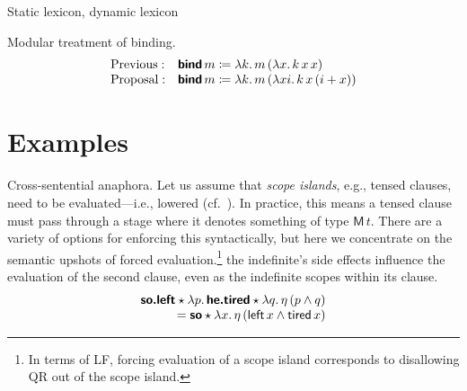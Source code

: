 	Static lexicon, dynamic lexicon
	
	Modular treatment of binding.%
	\[\begin{array}{ll}
		\text{Previous}:& \bsf{bind}\,m \ceq \lambda k.\,m\,(\lambda x.\,k\,x\,x)%
		\\
		\text{Proposal}:& \bsf{bind}\,m \ceq \lambda k.\,m\,(\lambda xi.\,k\,x\,(i + x))%
	\end{array}\]

\section{Examples}
	Cross-sentential anaphora. Let us assume that \emph{scope islands}, e.g., tensed clauses, need to be evaluated---i.e., lowered (cf.~\citealt{Barker:2002, BarkerShan:2008}). In practice, this means a tensed clause must pass through a stage where it denotes something of type $\textsf{M}\,t$. There are a variety of options for enforcing this syntactically, but here we concentrate on the semantic upshots of forced evaluation.\footnote{In terms of LF, forcing evaluation of a scope island corresponds to disallowing QR out of the scope island.} the indefinite's side effects influence the evaluation of the second clause, even as the indefinite scopes within its clause. %
	\[\begin{array}{r}
		\bsf{so.left} \star \lambda p.\,\bsf{he.tired} \star \lambda q.\,\eta\,(p \wedge q)%
		\\
		= \bsf{so} \star \lambda x.\,\eta\,(\textsf{left}\,x \wedge \textsf{tired}\,x)%
	\end{array}\]
